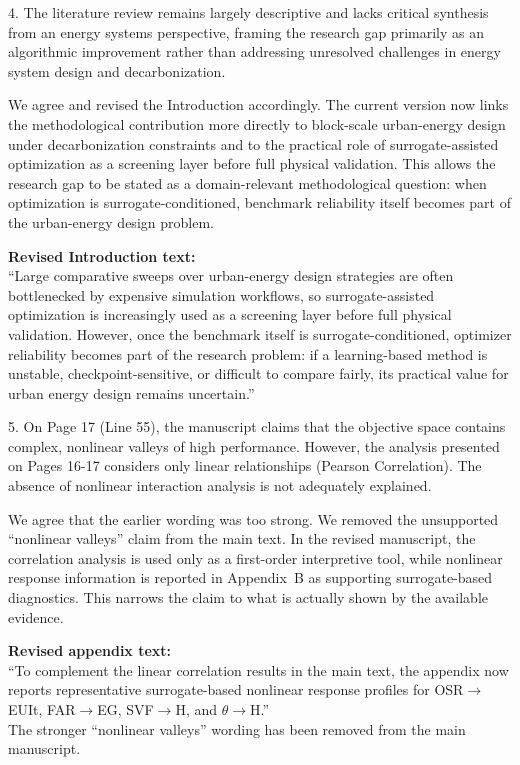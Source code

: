 \begin{ReviewerComment}
4. The literature review remains largely descriptive and lacks critical synthesis from an energy systems perspective, framing the research gap primarily as an algorithmic improvement rather than addressing unresolved challenges in energy system design and decarbonization.
\end{ReviewerComment}
%
\begin{Answer}
We agree and revised the Introduction accordingly. The current version now links the methodological contribution more directly to block-scale urban-energy design under decarbonization constraints and to the practical role of surrogate-assisted optimization as a screening layer before full physical validation. This allows the research gap to be stated as a domain-relevant methodological question: when optimization is surrogate-conditioned, benchmark reliability itself becomes part of the urban-energy design problem.
\end{Answer}
\begin{RevisionExcerpt}
\noindent\textbf{Revised Introduction text:}\\
``Large comparative sweeps over urban-energy design strategies are often bottlenecked by expensive simulation workflows, so surrogate-assisted optimization is increasingly used as a screening layer before full physical validation. However, once the benchmark itself is surrogate-conditioned, optimizer reliability becomes part of the research problem: if a learning-based method is unstable, checkpoint-sensitive, or difficult to compare fairly, its practical value for urban energy design remains uncertain.''
\end{RevisionExcerpt}

\begin{ReviewerComment}
5. On Page 17 (Line 55), the manuscript claims that the objective space contains complex, nonlinear valleys of high performance. However, the analysis presented on Pages 16-17 considers only linear relationships (Pearson Correlation). The absence of nonlinear interaction analysis is not adequately explained.
\end{ReviewerComment}
%
\begin{Answer}
We agree that the earlier wording was too strong. We removed the unsupported ``nonlinear valleys'' claim from the main text. In the revised manuscript, the correlation analysis is used only as a first-order interpretive tool, while nonlinear response information is reported in Appendix~B as supporting surrogate-based diagnostics. This narrows the claim to what is actually shown by the available evidence.
\end{Answer}
\begin{RevisionExcerpt}
\noindent\textbf{Revised appendix text:}\\
``To complement the linear correlation results in the main text, the appendix now reports representative surrogate-based nonlinear response profiles for OSR$\rightarrow$EUIt, FAR$\rightarrow$EG, SVF$\rightarrow$H, and $\theta\rightarrow$H.''\\[0.5em]
\noindent The stronger ``nonlinear valleys'' wording has been removed from the main manuscript.
\end{RevisionExcerpt}

